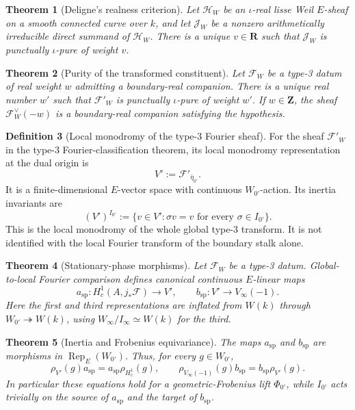 \documentclass[10pt]{article}
\newtheorem{theorem}{Theorem}[section]
\theoremstyle{definition}
\newtheorem{definition}[theorem]{Definition}
\begin{document}
\begin{theorem}[Deligne's realness criterion]
Let \(\mathcal H_W\) be an \(\iota\)-real lisse Weil \(E\)-sheaf on a smooth
connected curve over \(k\), and let \(\mathcal J_W\) be a nonzero
arithmetically irreducible direct summand of \(\mathcal H_W\).  There is a
unique \(v\in\mathbf R\) such that \(\mathcal J_W\) is punctually
\(\iota\)-pure of weight \(v\).
\end{theorem}

\begin{theorem}[Purity of the transformed constituent]
Let \(\mathcal F_W\) be a type-3 datum of real weight \(w\) admitting a
boundary-real companion.  There is a unique real number \(w'\) such that
\(\mathcal F'_W\) is punctually \(\iota\)-pure of weight \(w'\).  If
\(w\in\mathbf Z\), the sheaf \(\mathcal F_W^\vee(-w)\) is a boundary-real
companion satisfying the hypothesis.
\end{theorem}

\begin{definition}[Local monodromy of the type-3 Fourier sheaf]
For the sheaf \(\mathcal F'_W\) in the type-3 Fourier-classification theorem,
its local
monodromy representation at the dual origin is
\[
  V':=\mathcal F'_{\bar\eta_{0'}}.
\]
It is a finite-dimensional \(E\)-vector space with continuous
\(W_{0'}\)-action.  Its inertia invariants are
\[
  (V')^{I_{0'}}
  :=\{v\in V':\sigma v=v\text{ for every }\sigma\in I_{0'}\}.
\]
This is the local monodromy of the whole global type-3 transform.  It is not
identified with the local Fourier transform of the boundary stalk alone.
\end{definition}

\begin{theorem}[Stationary-phase morphisms]
Let \(\mathcal F_W\) be a type-3 datum.  Global-to-local Fourier comparison
defines canonical continuous \(E\)-linear maps
\[
 a_{\mathrm{sp}}:H_c^1(A,j_*\mathcal F)\longrightarrow V',
 \qquad
 b_{\mathrm{sp}}:V'\longrightarrow V_\infty(-1).
\]
Here the first and third representations are inflated from \(W(k)\) through
\(W_{0'}\twoheadrightarrow W(k)\), using
\(W_\infty/I_\infty\simeq W(k)\) for the third.
\end{theorem}

\begin{theorem}[Inertia and Frobenius equivariance]
The maps \(a_{\mathrm{sp}}\) and \(b_{\mathrm{sp}}\) are morphisms in
\(\operatorname{Rep}_E(W_{0'})\).  Thus, for every \(g\in W_{0'}\),
\[
 \rho_{V'}(g)a_{\mathrm{sp}}=a_{\mathrm{sp}}\rho_{H_c^1}(g),
 \qquad
 \rho_{V_\infty(-1)}(g)b_{\mathrm{sp}}
       =b_{\mathrm{sp}}\rho_{V'}(g).
\]
In particular these equations hold for a geometric-Frobenius lift
\(\Phi_{0'}\), while \(I_{0'}\) acts trivially on the source of
\(a_{\mathrm{sp}}\) and the target of \(b_{\mathrm{sp}}\).
\end{theorem}
\end{document}
